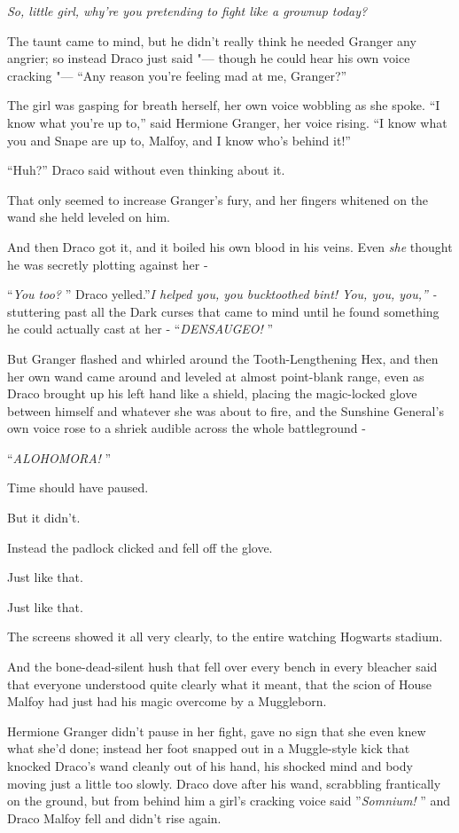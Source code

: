 \emph{So, little girl, why're you pretending to fight like a grownup
today?}

The taunt came to mind, but he didn't really think he needed Granger any
angrier; so instead Draco just said "--- though he could hear his own voice
cracking "--- ``Any reason you're feeling mad at me, Granger?''

The girl was gasping for breath herself, her own voice wobbling as she
spoke. ``I know what you're up to,'' said Hermione Granger, her voice
rising. ``I know what you and Snape are up to, Malfoy, and I know who's
behind it!''

``Huh?'' Draco said without even thinking about it.

That only seemed to increase Granger's fury, and her fingers whitened on
the wand she held leveled on him.

And then Draco got it, and it boiled his own blood in his veins. Even
\emph{she} thought he was secretly plotting against her -

``\emph{You too?} '' Draco yelled.''\emph{I helped you, you bucktoothed
bint! You, you, you,'' -} stuttering past all the Dark curses that came
to mind until he found something he could actually cast at her -
``\emph{DENSAUGEO!} ''

But Granger flashed and whirled around the Tooth-Lengthening Hex, and
then her own wand came around and leveled at almost point-blank range,
even as Draco brought up his left hand like a shield, placing the
magic-locked glove between himself and whatever she was about to fire,
and the Sunshine General's own voice rose to a shriek audible across the
whole battleground -

``\emph{ALOHOMORA!} ''

Time should have paused.

But it didn't.

Instead the padlock clicked and fell off the glove.

Just like that.

Just like that.

The screens showed it all very clearly, to the entire watching Hogwarts
stadium.

And the bone-dead-silent hush that fell over every bench in every
bleacher said that everyone understood quite clearly what it meant, that
the scion of House Malfoy had just had his magic overcome by a
Muggleborn.

Hermione Granger didn't pause in her fight, gave no sign that she even
knew what she'd done; instead her foot snapped out in a Muggle-style
kick that knocked Draco's wand cleanly out of his hand, his shocked mind
and body moving just a little too slowly. Draco dove after his wand,
scrabbling frantically on the ground, but from behind him a girl's
cracking voice said ''\emph{Somnium!} '' and Draco Malfoy fell and didn't
rise again.

